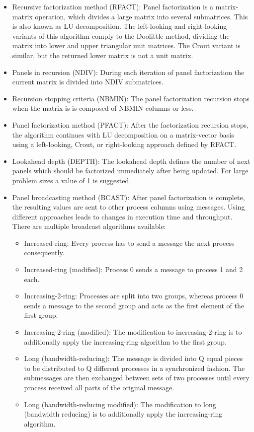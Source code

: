 \documentclass[10pt,twocolumn]{article}
\begin{document}
\begin{itemize}
\item Recursive factorization method (RFACT): Panel factorization is a matrix-matrix operation, which divides a large matrix into several submatrices. This is also known as LU decomposition. The left-looking and right-looking variants of this algorithm comply to the Doolittle method, dividing the matrix into lower and upper triangular unit matrices. The Crout variant is similar, but the returned lower matrix is not a unit matrix.

\item Panels in recursion (NDIV): During each iteration of panel factorization the current matrix is divided into NDIV submatrices.

\item Recursion stopping criteria (NBMIN): The panel factorization recursion stops when the matrix is is composed of NBMIN columns or less.

\item Panel factorization method (PFACT): After the factorization recursion stops, the algorithm continues with LU decomposition on a matrix-vector basis using a left-looking, Crout, or right-looking approach defined by RFACT.

\item Lookahead depth (DEPTH): The lookahead depth defines the number of next panels which should be factorized immediately after being updated. For large problem sizes a value of 1 is suggested.

\item Panel broadcasting method (BCAST): After panel factorization is complete, the resulting values are sent to other process columns using messages. Using different approaches leads to changes in execution time and throughput. There are multiple broadcast algorithms available:
\begin{itemize}
\item Increased-ring: Every process has to send a message the next process consequently.
\item Increased-ring (modified): Process 0 sends a message to process 1 and 2 each. 
\item Increasing-2-ring: Processes are split into two groups, whereas process 0 sends a message to the second group and acts as the first element of the first group.
\item Increasing-2-ring (modified): The modification to increasing-2-ring is to additionally apply the increasing-ring algorithm to the first group.
\item Long (bandwidth-reducing): The message is divided into Q equal pieces to be distributed to Q different processes in a synchronized fashion. The submessages are then exchanged between sets of two processes until every process received all parts of the original message.
\item Long (bandwidth-reducing modified): The modification to long (bandwidth reducing) is to additionally apply the increasing-ring algorithm.
\end{itemize}


\end{itemize}
\end{document}
